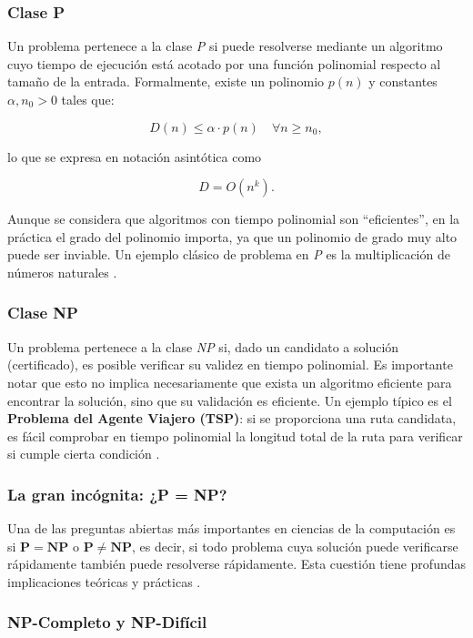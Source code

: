 \documentclass[12pt,titlepage,twoside,openright]{book}
\begin{document}
\subsubsection*{Clase P}
Un problema pertenece a la clase \emph{P} si puede resolverse mediante un algoritmo cuyo tiempo de ejecución está acotado por una función polinomial respecto al tamaño de la entrada. Formalmente, existe un polinomio \(p(n)\) y constantes \(\alpha, n_0 > 0\) tales que:

\[
	D(n) \leq \alpha \cdot p(n) \quad \forall n \geq n_0,
\]

lo que se expresa en notación asintótica como

\[
	D = O(n^k).
\]

Aunque se considera que algoritmos con tiempo polinomial son “eficientes”, en la práctica el grado del polinomio importa, ya que un polinomio de grado muy alto puede ser inviable. Un ejemplo clásico de problema en \emph{P} es la multiplicación de números naturales \citep{Flores2014}.

\subsubsection*{Clase NP}
Un problema pertenece a la clase \emph{NP} si, dado un candidato a solución (certificado), es posible verificar su validez en tiempo polinomial. Es importante notar que esto no implica necesariamente que exista un algoritmo eficiente para encontrar la solución, sino que su validación es eficiente. Un ejemplo típico es el \textbf{Problema del Agente Viajero (TSP)}: si se proporciona una ruta candidata, es fácil comprobar en tiempo polinomial la longitud total de la ruta para verificar si cumple cierta condición \citep{Flores2014}.

\subsubsection*{La gran incógnita: ¿P = NP?} 
Una de las preguntas abiertas más importantes en ciencias de la computación es si \(\mathbf{P = NP}\) o \(\mathbf{P \neq NP}\), es decir, si todo problema cuya solución puede verificarse rápidamente también puede resolverse rápidamente. Esta cuestión tiene profundas implicaciones teóricas y prácticas \citep{maldonado2013problema}.

\subsubsection{NP-Completo y NP-Difícil}
\end{document}
